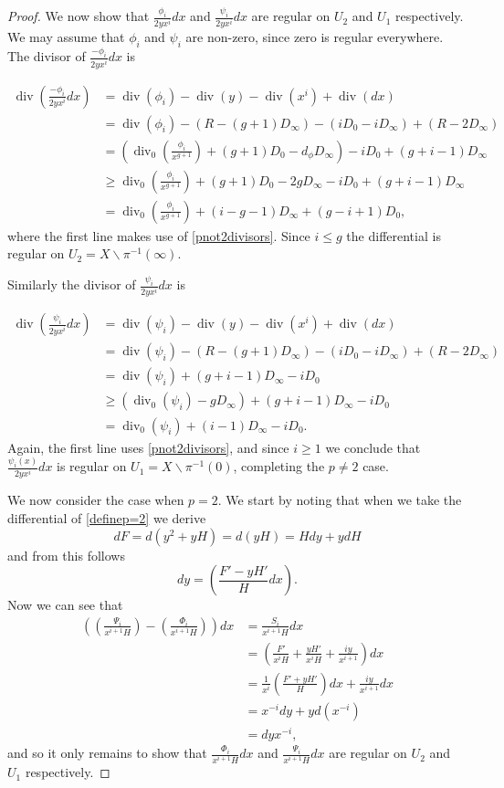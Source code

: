 \documentclass[draft, 11pt]{article} %
\theoremstyle{plain}
\theoremstyle{remark}
\DeclareMathOperator{\di}{div}
\begin{document}
\begin{proof}
We now show that $\frac{\phi_i}{2yx^i}dx$ and $\frac{\psi_i}{2yx^i}dx$ are regular on $U_2$ and $U_1$ respectively.
We may assume that $\phi_i$ and $\psi_i$ are non-zero, since zero is regular everywhere.
The divisor of $\frac{-\phi_i}{2yx^i}dx$ is

\begin{align*}
\di\left( \frac{-\phi_i}{2yx^i}dx \right) & =  \di(\phi_i) -\di(y) - \di(x^i) + \di (dx) \\
& =  \di(\phi_i) - ( R - (g+1)D_\infty) - (iD_0 - iD_\infty) + (R - 2D_\infty) \\
& =  \left( \di_0\left( \frac{\phi_i}{x^{g+1}}\right) + (g+1)D_0 - d_\phi D_\infty\right) - iD_0 + (g+i-1)D_\infty \\
& \geq  \di_0\left( \frac{\phi_i}{x^{g+1}}\right) + (g+1)D_0 - 2gD_\infty - iD_0 + (g+i-1)D_\infty \\
& =  \di_0\left( \frac{\phi_i}{x^{g+1}} \right) + (i-g-1)D_\infty + (g-i+1)D_0,
\end{align*}
where the first line makes use of \eqref{pnot2divisors}.
Since $i \leq g$ the differential is regular on $U_2 = X\backslash \pi^{-1}(\infty)$.

Similarly the divisor of $\frac{\psi_i}{2yx^i}dx$ is

\begin{align*}
\di \left( \frac{\psi_i}{2yx^i}dx\right) & =  \di(\psi_i) - \di(y) - \di(x^i) + \di (dx) \\
& =  \di (\psi_i ) -(R - (g+1)D_\infty) - (iD_0 - iD_\infty) + (R -2D_\infty) \\
& =  \di(\psi_i) + (g+i-1)D_\infty -iD_0 \\
& \geq \left( \di_0(\psi_i) - gD_\infty \right) + (g+i-1)D_\infty -iD_0 \\
& =  \di_0(\psi_i) + (i-1)D_\infty - iD_0.
\end{align*}
Again, the first line uses \eqref{pnot2divisors}, and since $i\geq 1$ we conclude that $\frac{\psi_i(x)}{2yx^i}dx$ is regular on $U_1 = X \backslash \pi^{-1}(0)$, completing the $p\neq 2$ case.


We now consider the case when $p=2$.
We start by noting that when we take the differential of \eqref{definep=2} we derive
\[
dF = d\left(y^2 + yH \right) = d(yH) = Hdy + ydH
\]
and from this follows 
\[
dy = \left(\frac{F'-yH'}{H}dx\right).
\]
Now we can see that
\begin{align*}
\left( \left( \frac{ \Psi_i}{x^{i+1}H} \right) - \left( \frac{\Phi_i}{x^{i+1}H} \right) \right) dx & =  \frac{S_i}{x^{i+1}H}dx \\
& =  \left( \frac{F'}{x^iH} + \frac{yH'}{x^iH} + \frac{iy}{x^{i+1}} \right) dx \\
& =  \frac{1}{x^i}\left( \frac{F' + yH'}{H} \right) dx + \frac{iy}{x^{i+1}}dx \\
& =  x^{-i}dy + yd \left( x^{-i}\right) \\
& =  dyx^{-i},
\end{align*}
and so it only remains to show that $\frac{\Phi_i}{x^{i+1}H}dx$ and $\frac{\Psi_i}{x^{i+1}H}dx$ are regular on $U_2$ and $U_1$ respectively.



\end{proof}
\end{document}
